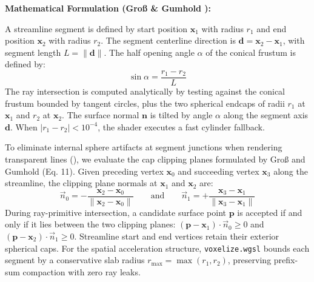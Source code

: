 \documentclass[10pt,a4paper]{article}
\begin{document}
\newpage
\noindent \textbf{Mathematical Formulation (Gro\ss{} \& Gumhold \cite{gross2021advanced}):}

A streamline segment is defined by start position $\mathbf{x}_1$ with radius $r_1$ and end position $\mathbf{x}_2$ with radius $r_2$. The segment centerline direction is $\mathbf{d} = \mathbf{x}_2 - \mathbf{x}_1$, with segment length $L = \|\mathbf{d}\|$. The half opening angle $\alpha$ of the conical frustum is defined by:
\begin{equation}
\sin \alpha = \frac{r_1 - r_2}{L}
\end{equation}
The ray intersection is computed analytically by testing against the conical frustum bounded by tangent circles, plus the two spherical endcaps of radii $r_1$ at $\mathbf{x}_1$ and $r_2$ at $\mathbf{x}_2$. The surface normal $\mathbf{n}$ is tilted by angle $\alpha$ along the segment axis $\mathbf{d}$. When $|r_1 - r_2| < 10^{-4}$, the shader executes a fast cylinder fallback.

To eliminate internal sphere artifacts at segment junctions when rendering transparent lines (), we evaluate the cap clipping planes formulated by Gro\ss{} and Gumhold \cite{gross2021advanced} (Eq. 11). Given preceding vertex $\mathbf{x}_0$ and succeeding vertex $\mathbf{x}_3$ along the streamline, the clipping plane normals at $\mathbf{x}_1$ and $\mathbf{x}_2$ are:
\begin{equation}
\vec{n}_0 = -\frac{\mathbf{x}_2 - \mathbf{x}_0}{\|\mathbf{x}_2 - \mathbf{x}_0\|} \qquad \text{and} \qquad \vec{n}_1 = +\frac{\mathbf{x}_3 - \mathbf{x}_1}{\|\mathbf{x}_3 - \mathbf{x}_1\|}
\end{equation}
During ray-primitive intersection, a candidate surface point $\mathbf{p}$ is accepted if and only if it lies between the two clipping planes: $(\mathbf{p} - \mathbf{x}_1) \cdot \vec{n}_0 \ge 0$ and $(\mathbf{p} - \mathbf{x}_2) \cdot \vec{n}_1 \ge 0$. Streamline start and end vertices retain their exterior spherical caps. For the spatial acceleration structure, \texttt{voxelize.wgsl} bounds each segment by a conservative slab radius $r_{\max} = \max(r_1, r_2)$, preserving prefix-sum compaction with zero ray leaks.
\end{document}
